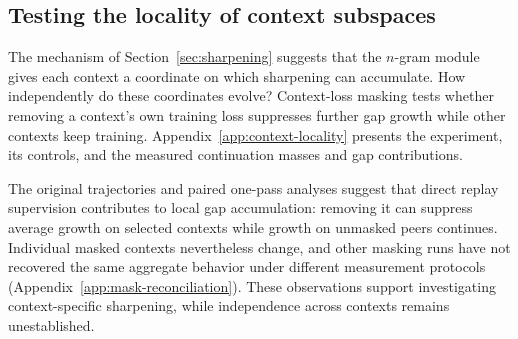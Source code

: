 \FloatBarrier
\subsection{Testing the locality of context subspaces}
\label{sec:context-locality}
The mechanism of Section~\ref{sec:sharpening} suggests that the $n$-gram module gives each context a coordinate on which sharpening can accumulate. How independently do these coordinates evolve? Context-loss masking tests whether removing a context's own training loss suppresses further gap growth while other contexts keep training. Appendix~\ref{app:context-locality} presents the experiment, its controls, and the measured continuation masses and gap contributions.

The original trajectories and paired one-pass analyses suggest that direct replay supervision contributes to local gap accumulation: removing it can suppress average growth on selected contexts while growth on unmasked peers continues. Individual masked contexts nevertheless change, and other masking runs have not recovered the same aggregate behavior under different measurement protocols (Appendix~\ref{app:mask-reconciliation}). These observations support investigating context-specific sharpening, while independence across contexts remains unestablished.

\FloatBarrier
